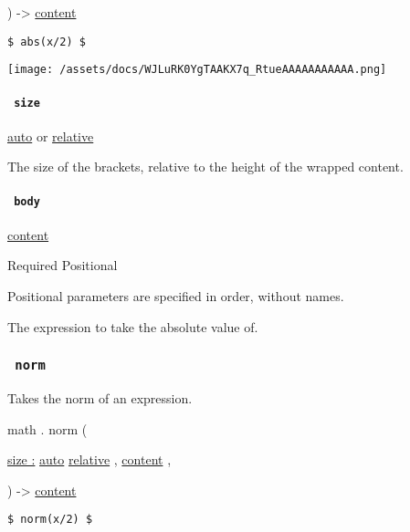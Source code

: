 ) -\textgreater{} \href{/docs/reference/foundations/content/}{content}

\begin{verbatim}
$ abs(x/2) $
\end{verbatim}

\texttt{[image: /assets/docs/WJLuRK0YgTAAKX7q\_RtueAAAAAAAAAAA.png]}

\paragraph{\texorpdfstring{\texttt{\ size\ }}{ size }}\label{functions-abs-size}

\href{/docs/reference/foundations/auto/}{auto} {or}
\href{/docs/reference/layout/relative/}{relative}

The size of the brackets, relative to the height of the wrapped content.

\paragraph{\texorpdfstring{\texttt{\ body\ }}{ body }}\label{functions-abs-body}

\href{/docs/reference/foundations/content/}{content}

{Required} {{ Positional }}

\label{functions-abs-body-positional-tooltip}
Positional parameters are specified in order, without names.

The expression to take the absolute value of.

\subsubsection{\texorpdfstring{\texttt{\ norm\ }}{ norm }}\label{functions-norm}

Takes the norm of an expression.

math { . } { norm } (

{ \hyperref[functions-norm-parameters-size]{size :}
\href{/docs/reference/foundations/auto/}{auto}
\href{/docs/reference/layout/relative/}{relative} , } {
\href{/docs/reference/foundations/content/}{content} , }

) -\textgreater{} \href{/docs/reference/foundations/content/}{content}

\begin{verbatim}
$ norm(x/2) $
\end{verbatim}

